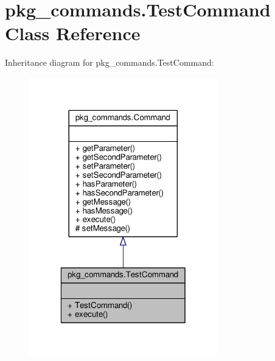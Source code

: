 \hypertarget{classpkg__commands_1_1TestCommand}{\section{pkg\-\_\-commands.\-Test\-Command Class Reference}
\label{classpkg__commands_1_1TestCommand}
}


Inheritance diagram for pkg\-\_\-commands.\-Test\-Command\-:
\nopagebreak
\begin{figure}[H]
\begin{center}
\leavevmode
\includegraphics[width=232pt]{classpkg__commands_1_1TestCommand__inherit__graph}
\end{center}
\end{figure}



